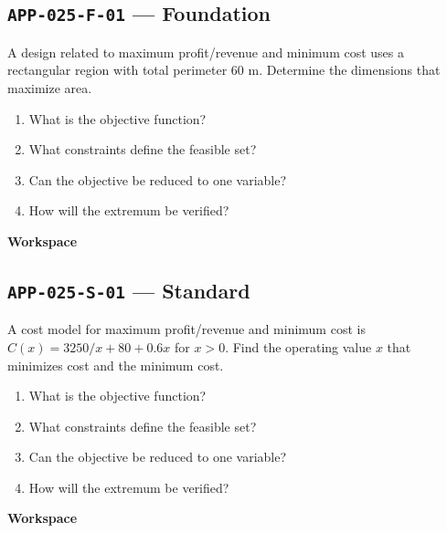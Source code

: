 \documentclass[11pt]{book}
\newcommand{\pid}[1]{\texttt{#1}}
\newcommand{\workspace}{\par\vspace{0.7in}\hrulefill\par\vspace{0.55in}\hrulefill\par}
\begin{document}
\subsection*{\pid{APP-025-F-01} — Foundation}
\begin{problembox}
A design related to maximum profit/revenue and minimum cost uses a rectangular region with total perimeter 60 m. Determine the dimensions that maximize area.
\end{problembox}
\begin{promptbox}\begin{enumerate}
\item What is the objective function?
\item What constraints define the feasible set?
\item Can the objective be reduced to one variable?
\item How will the extremum be verified?
\end{enumerate}\end{promptbox}
\textbf{Workspace}\workspace
{}
\subsection*{\pid{APP-025-S-01} — Standard}
\begin{problembox}
A cost model for maximum profit/revenue and minimum cost is $C(x)=3250/x+80+0.6x$ for $x>0$. Find the operating value $x$ that minimizes cost and the minimum cost.
\end{problembox}
\begin{promptbox}\begin{enumerate}
\item What is the objective function?
\item What constraints define the feasible set?
\item Can the objective be reduced to one variable?
\item How will the extremum be verified?
\end{enumerate}\end{promptbox}
\textbf{Workspace}\workspace
{}
\end{document}
